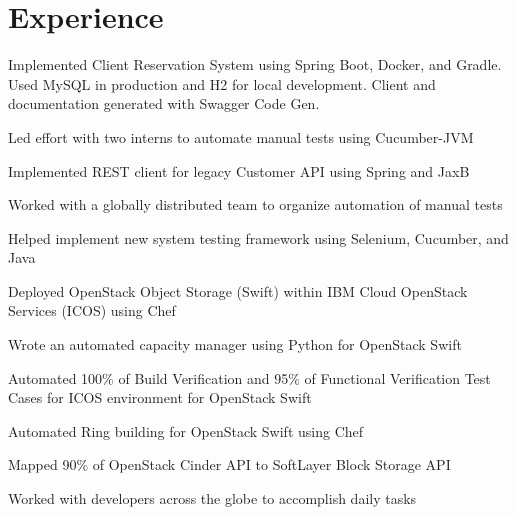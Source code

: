 \documentclass[letterpaper]{resume} %
\begin{document}
\begin{minipage}[t]{0.66\textwidth} %


\section{Experience}

\vspace{\topsep} %
\begin{tightitemize}
\item Implemented Client Reservation System using Spring Boot, Docker, and Gradle.  Used MySQL in production and H2 for local development.  Client and documentation generated with Swagger Code Gen.
\item Led effort with two interns to automate manual tests using Cucumber-JVM
\item Implemented REST client for legacy Customer API using Spring and JaxB
\item Worked with a globally distributed team to organize automation of manual tests
\item Helped implement new system testing framework using Selenium, Cucumber, and Java
\end{tightitemize}

\sectionspace %

\begin{tightitemize}
\item Deployed OpenStack Object Storage (Swift) within IBM Cloud OpenStack Services (ICOS) using Chef
\item Wrote an automated capacity manager using Python for OpenStack Swift
\item Automated 100\% of Build Verification and 95\% of Functional Verification Test Cases for ICOS environment for OpenStack Swift
\item Automated Ring building for OpenStack Swift using Chef
\item Mapped 90\% of OpenStack Cinder API to SoftLayer Block Storage API
\item Worked with developers across the globe to accomplish daily tasks
\end{tightitemize}


\end{minipage}
\end{document}
